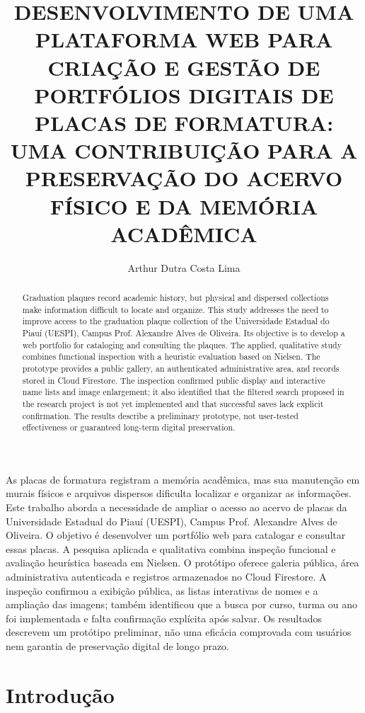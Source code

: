 \documentclass[12pt]{article}
\title{DESENVOLVIMENTO DE UMA PLATAFORMA WEB PARA CRIAÇÃO E GESTÃO
DE PORTFÓLIOS DIGITAIS DE PLACAS DE FORMATURA: UMA CONTRIBUIÇÃO
PARA A PRESERVAÇÃO DO ACERVO FÍSICO E DA MEMÓRIA ACADÊMICA}
\author{Arthur Dutra Costa Lima\inst{1}}
\begin{document}
\maketitle

\begin{abstract}
  Graduation plaques record academic history, but physical and dispersed
  collections make information difficult to locate and organize. This study
  addresses the need to improve access to the graduation plaque collection of
  the Universidade Estadual do Piauí (UESPI), Campus Prof. Alexandre Alves de
  Oliveira. Its objective is to develop a web portfolio for cataloging and
  consulting the plaques. The applied, qualitative study combines functional
  inspection with a heuristic evaluation based on Nielsen. The prototype
  provides a public gallery, an authenticated administrative area, and records
  stored in Cloud Firestore. The inspection confirmed public display and
  interactive name lists and image enlargement; it also identified that the
  filtered search proposed in the research project is not yet implemented and
  that successful saves lack explicit confirmation. The results describe a
  preliminary prototype, not user-tested effectiveness or guaranteed
  long-term digital preservation.
\end{abstract}

\begin{resumo}
  As placas de formatura registram a memória acadêmica, mas sua manutenção em
  murais físicos e arquivos dispersos dificulta localizar e organizar as
  informações. Este trabalho aborda a necessidade de ampliar o acesso ao acervo
  de placas da Universidade Estadual do Piauí (UESPI), Campus Prof. Alexandre
  Alves de Oliveira. O objetivo é desenvolver um portfólio web para catalogar e
  consultar essas placas. A pesquisa aplicada e qualitativa combina inspeção
  funcional e avaliação heurística baseada em Nielsen. O protótipo oferece
  galeria pública, área administrativa autenticada e registros armazenados no
  Cloud Firestore. A inspeção confirmou a exibição pública, as listas
  interativas de nomes e a ampliação das imagens; também identificou que a
  busca por curso, turma ou ano foi implementada e falta
  confirmação explícita após salvar. Os resultados descrevem um protótipo
  preliminar, não uma eficácia comprovada com usuários nem garantia de
  preservação digital de longo prazo.
\end{resumo}

\section{Introdução}
\end{document}
